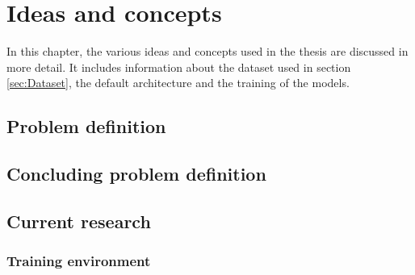 \chapter{Ideas and concepts}
\label{ch:Ideas-Concepts}

In this chapter, the various ideas and concepts used in the thesis are discussed in more detail. It includes information about the dataset used in section \ref{sec:Dataset}, the default architecture and the training of the models.

\section{Problem definition}
\label{sec:Problem-Definition}

\section{Concluding problem definition}
\label{sec:Concluding-Problem-Definition}

\section{Current research}
\label{sec:Current-Research}

\subsection{Training environment}
\label{sub:Training-Environment}

